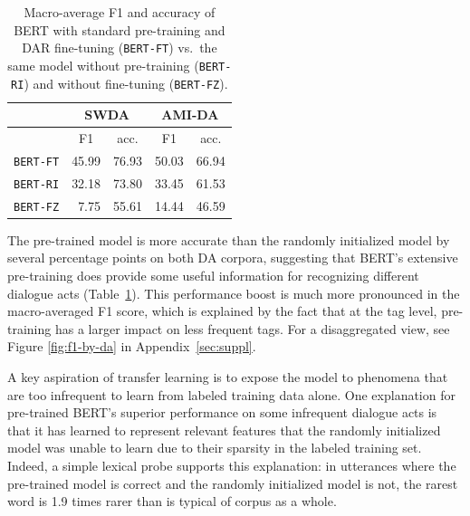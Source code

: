 \documentclass[11pt,a4paper]{article}
\begin{document}
\begin{table}[]
\centering
\begin{tabular}{@{}lrrrr@{}}
\toprule
                           & \multicolumn{2}{c}{SWDA}                          & \multicolumn{2}{c}{AMI-DA}                        \\ \midrule
                           & \multicolumn{1}{c}{F1} & \multicolumn{1}{c}{acc.} & \multicolumn{1}{c}{F1} & \multicolumn{1}{c}{acc.} \\
\texttt{BERT-FT} & 45.99           & 76.93                    & 50.03                  & 66.94                    \\
\texttt{BERT-RI} & 32.18           & 73.80                    & 33.45                  & 61.53                    \\
\texttt{BERT-FZ} & 7.75            & 55.61                    & 14.44                  & 46.59 \\
  \bottomrule
\end{tabular}
  \caption{Macro-average F1 and accuracy of BERT with standard pre-training and DAR fine-tuning (\texttt{BERT-FT}) vs.~the same model without pre-training (\texttt{BERT-RI}) and without fine-tuning (\texttt{BERT-FZ}).}
  \label{table:exp2}
\end{table}

The pre-trained model is more accurate than the randomly initialized model by several percentage points on both DA corpora,
suggesting that BERT's extensive pre-training does provide some useful information for recognizing different dialogue acts (Table~\ref{table:exp2}).
This performance boost is much more pronounced in the macro-averaged F1 score,
which is explained by the fact that at the tag level, pre-training has a larger impact on less frequent tags.
For a disaggregated view, see Figure \ref{fig:f1-by-da} in Appendix~\ref{sec:suppl}.

A key aspiration of transfer learning is to expose the model to phenomena that are too infrequent to learn from labeled training data alone.
One explanation for pre-trained BERT's superior performance on some infrequent dialogue acts is that it has learned to represent relevant features
that the randomly initialized model was unable to learn due to their sparsity in the labeled training set.
Indeed, a simple lexical probe supports this explanation: in utterances where the pre-trained model is correct and the randomly initialized model is not,
the rarest word is 1.9 times rarer than is typical of corpus as a whole.
\end{document}
